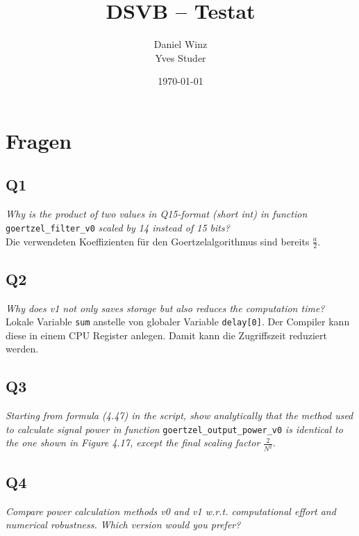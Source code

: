 \documentclass[a4,paper,fleqn]{article}
\title{DSVB -- Testat}
\date{\today}
\author{Daniel Winz\\Yves Studer}
\begin{document}
\maketitle
\clearpage

\section{Fragen}

\subsection{Q1}
\label{q1}
\emph{Why is the product of two values in Q15-format (short int) in function 
}\verb?goertzel_filter_v0?\emph{ scaled by 14 instead of 15 bits?}\\
Die verwendeten Koeffizienten für den Goertzelalgorithmus sind bereits 
$\frac{a}{2}$. 

\subsection{Q2}
\label{q2}
\emph{Why does v1 not only saves storage but also reduces the computation 
time?}\\
Lokale Variable \verb?sum? anstelle von globaler Variable \verb?delay[0]?. Der 
Compiler kann diese in einem CPU Register anlegen. Damit kann die Zugriffszeit 
reduziert werden. 

\subsection{Q3}
\label{q3}
\emph{Starting from formula (4.47) in the script, show analytically that the 
method used to calculate signal power in function 
}\verb?goertzel_output_power_v0?\emph{ is identical to the one shown in Figure 
4.17, except the final scaling factor} $\frac{2}{N^2}$.\\

\subsection{Q4}
\label{q4}
\emph{Compare power calculation methods v0 and v1 w.r.t. computational effort 
and numerical robustness. Which version would you prefer?}\\
\end{document}
